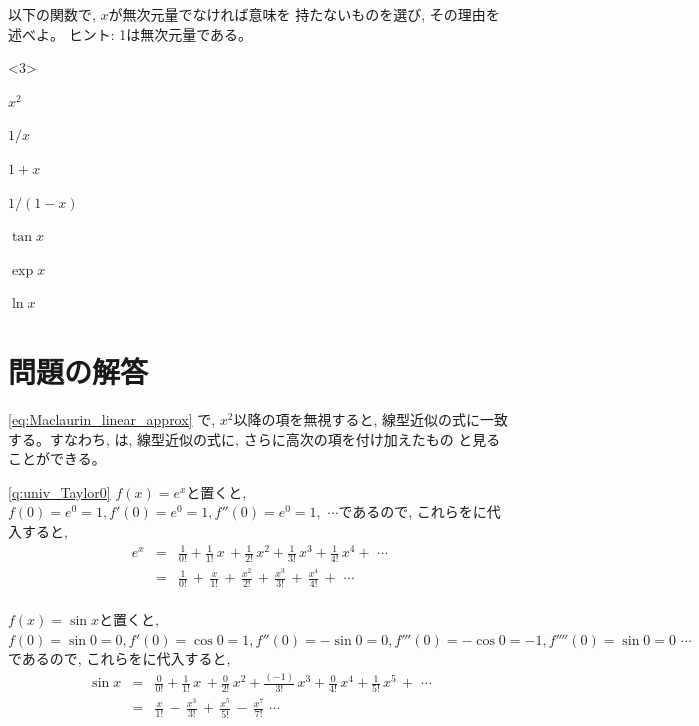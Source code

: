 \begin{exq}\label{q:funct_dim_seigou} 以下の関数で, $x$が無次元量でなければ意味を
持たないものを選び, その理由を述べよ。 ヒント: 1は無次元量である。
\begin{edaenumerate}<3>
\item $x^2$
\item $1/x$
\item $1+x$
\item $1/(1-x)$
\item $\tan x$
\item $\exp x$
\item $\ln x$
\end{edaenumerate}\end{exq}
\hv










\section*{問題の解答}


\ref{eq:Maclaurin_linear_approx} 
で, $x^2$以降の項を無視すると, 線型近似の式に一致する。すなわち, 
は, 線型近似の式に, さらに高次の項を付け加えたもの
と見ることができる。\mv

\ref{q:univ_Taylor0}
$f(x)=e^x$と置くと, $f(0)=e^0=1, f'(0)=e^0=1, f''(0)=e^0=1,\,\,\cdots$であるので, これらをに代入すると, 
\begin{eqnarray*}
e^x &=& \frac{1}{0!} + \frac{1}{1!}\,x\, + \frac{1}{2!}\,x^2 + \frac{1}{3!}\,x^3 + \frac{1}{4!}\,x^4 +\,\, \cdots \\
&=& \frac{1}{0!}\,+\,\frac{x}{1!}\, +\,\frac{x^2}{2!}\,+\,\frac{x^3}{3!}\,+\,\frac{x^4}{4!}\,+\,\, \cdots \\
\end{eqnarray*}

$f(x)=\sin x$と置くと, $f(0)=\sin 0 = 0, f'(0)=\cos 0 = 1, f''(0)=-\sin 0 = 0, f'''(0)=-\cos 0= -1 , f''''(0) = \sin 0 = 0 \,\,\cdots$であるので, これらをに代入すると, 
\begin{eqnarray*}
\sin x &=& \frac{0}{0!} + \frac{1}{1!}\,x\, + \frac{0}{2!}\,x^2 + \frac{(-1)}{3!}\,x^3 + \frac{0}{4!}\,x^4 + \frac{1}{5!}\,x^5\,+\,\, \cdots \\
&=& \frac{x}{1!}\,-\,\frac{x^3}{3!}\,+\,\frac{x^5}{5!}\,-\,\frac{x^7}{7!}\,\, \cdots \\
\end{eqnarray*}

